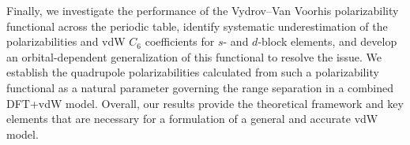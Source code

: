 Finally, we investigate the performance of the Vydrov--Van Voorhis polarizability functional across the periodic table, identify systematic underestimation of the polarizabilities and vdW $C_6$ coefficients for $s$- and $d$-block elements, and develop an orbital-dependent generalization of this functional to resolve the issue.
We establish the quadrupole polarizabilities calculated from such a polarizability functional as a natural parameter governing the range separation in a combined DFT+vdW model.
Overall, our results provide the theoretical framework and key elements that are necessary for a formulation of a general and accurate vdW model.
